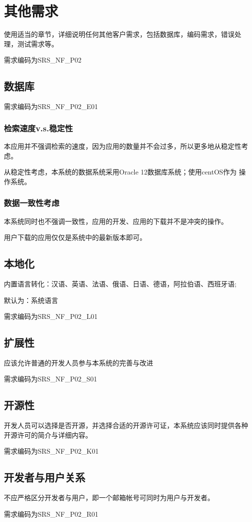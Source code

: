 \chapter{其他需求}

使用适当的章节，详细说明任何其他客户需求，包括数据库，编码需求，错误处理，测试需求等。

需求编码为SRS\_NF\_P02

\section{数据库}

需求编码为SRS\_NF\_P02\_E01
{\color{red}

\subsection{检索速度v.s.稳定性}
本应用并不强调检索的速度，因为应用的数量并不会过多，所以更多地从稳定性考虑。


    从稳定性考虑，本系统的数据系统采用Oracle 12数据库系统；使用centOS作为
    操作系统。

\subsection{数据一致性考虑}
本系统同时也不强调一致性，应用的开发、应用的下载并不是冲突的操作。

用户下载的应用仅仅是系统中的最新版本即可。

}


\section{本地化}
内置语言转化：汉语、英语、法语、俄语、日语、德语，阿拉伯语、西班牙语;

默认为：系统语言

需求编码为SRS\_NF\_P02\_L01

\section{扩展性}
应该允许普通的开发人员参与本系统的完善与改进

需求编码为SRS\_NF\_P02\_S01

\section{开源性}
开发人员可以选择是否开源，并选择合适的开源许可证，本系统应该同时提供各种开源许可的简介与详细内容。

需求编码为SRS\_NF\_P02\_K01

\section{开发者与用户关系}
不应严格区分开发者与用户，即一个邮箱帐号可同时为用户与开发者。

需求编码为SRS\_NF\_P02\_R01
